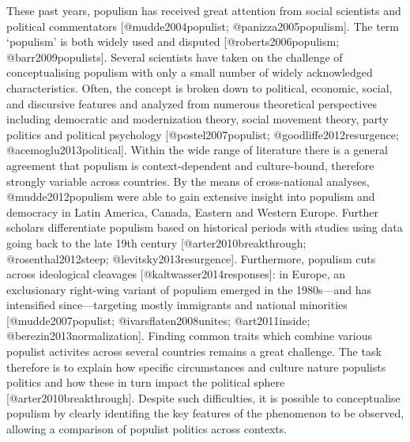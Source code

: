 \documentclass[]{article}
\title{}
\author{}
\date{}
\begin{document}
These past years, populism has received great attention from social
scientists and political commentators {[}@mudde2004populist;
@panizza2005populism{]}. The term `populism' is both widely used and
disputed {[}@roberts2006populism; @barr2009populists{]}. Several
scientists have taken on the challenge of conceptualising populism with
only a small number of widely acknowledged characteristics. Often, the
concept is broken down to political, economic, social, and discursive
features and analyzed from numerous theoretical perspectives including
democratic and modernization theory, social movement theory, party
politics and political psychology {[}@postel2007populist;
@goodliffe2012resurgence; @acemoglu2013political{]}. Within the wide
range of literature there is a general agreement that populism is
context-dependent and culture-bound, therefore strongly variable across
countries. By the means of cross-national analyses, @mudde2012populism
were able to gain extensive insight into populism and democracy in Latin
America, Canada, Eastern and Western Europe. Further scholars
differentiate populism based on historical periods with studies using
data going back to the late 19th century {[}@arter2010breakthrough;
@rosenthal2012steep; @levitsky2013resurgence{]}. Furthermore, populism
cuts across ideological cleavages {[}@kaltwasser2014responses{]}: in
Europe, an exclusionary right-wing variant of populism emerged in the
1980s---and has intensified since---targeting mostly immigrants and
national minorities {[}@mudde2007populist; @ivarsflaten2008unites;
@art2011inside; @berezin2013normalization{]}. Finding common traits
which combine various populist activites across several countries
remains a great challenge. The task therefore is to explain how specific
circumstances and culture nature populists politics and how these in
turn impact the political sphere {[}@arter2010breakthrough{]}. Despite
such difficulties, it is possible to conceptualise populism by clearly
identifing the key features of the phenomenon to be observed, allowing a
comparison of populist politics across contexts.
\end{document}

